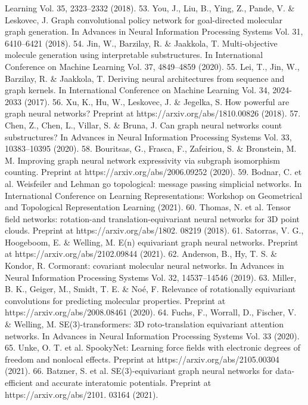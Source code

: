 Learning Vol. 35, 2323–2332 (2018).
	53.
You, J., Liu, B., Ying, Z., Pande, V. \& Leskovec, J. Graph convolutional
policy network for goal-directed molecular graph generation. In Advances
in Neural Information Processing Systems Vol. 31, 6410–6421 (2018).
	54.
Jin, W., Barzilay, R. \& Jaakkola, T. Multi-objective molecule generation
using interpretable substructures. In International Conference on Machine
Learning Vol. 37, 4849–4859 (2020).
	55.
Lei, T., Jin, W., Barzilay, R. \& Jaakkola, T. Deriving neural architectures
from sequence and graph kernels. In International Conference on Machine
Learning Vol. 34, 2024-2033 (2017).
	56.
Xu, K., Hu, W., Leskovec, J. \& Jegelka, S. How powerful are graph neural
networks? Preprint at https://arxiv.org/abs/1810.00826 (2018).
	57.
Chen, Z., Chen, L., Villar, S. \& Bruna, J. Can graph neural networks count
substructures? In Advances in Neural Information Processing Systems Vol. 33,
10383–10395 (2020).
	58.
Bouritsas, G., Frasca, F., Zafeiriou, S. \& Bronstein, M. M. Improving graph
neural network expressivity via subgraph isomorphism counting. Preprint
at https://arxiv.org/abs/2006.09252 (2020).
	59.
Bodnar, C. et al. Weisfeiler and Lehman go topological: message passing
simplicial networks. In International Conference on Learning
Representations: Workshop on Geometrical and Topological Representation
Learning (2021).
	60.
Thomas, N. et al. Tensor field networks: rotation-and translation-equivariant
neural networks for 3D point clouds. Preprint at https://arxiv.org/abs/1802.
08219 (2018).
	61.
Satorras, V. G., Hoogeboom, E. \& Welling, M. E(n) equivariant graph
neural networks. Preprint at https://arxiv.org/abs/2102.09844 (2021).
	62.
Anderson, B., Hy, T. S. \& Kondor, R. Cormorant: covariant molecular
neural networks. In Advances in Neural Information Processing Systems Vol.
32, 14537–14546 (2019).
	63.
Miller, B. K., Geiger, M., Smidt, T. E. \& Noé, F. Relevance of rotationally
equivariant convolutions for predicting molecular properties. Preprint at
https://arxiv.org/abs/2008.08461 (2020).
	64.
Fuchs, F., Worrall, D., Fischer, V. \& Welling, M. SE(3)-transformers: 3D
roto-translation equivariant attention networks. In Advances in Neural
Information Processing Systems Vol. 33 (2020).
	65.
Unke, O. T. et al. SpookyNet: Learning force fields with electronic degrees
of freedom and nonlocal effects. Preprint at https://arxiv.org/abs/2105.00304
(2021).
	66.
Batzner, S. et al. SE(3)-equivariant graph neural networks for data-efficient
and accurate interatomic potentials. Preprint at https://arxiv.org/abs/2101.
03164 (2021).
